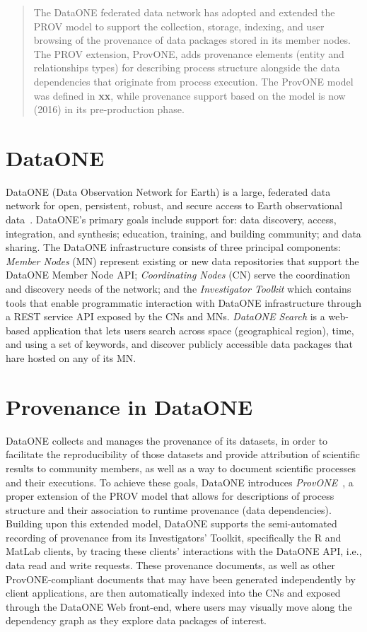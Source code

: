 \documentclass[a4paper]{llncs}
\begin{document}
\begin{abstract}
The DataONE federated data network has adopted and extended the PROV model to support the collection, storage, indexing, and user browsing of the provenance of data packages stored in its member nodes. The PROV extension, ProvONE, adds provenance elements (entity and relationships types) for describing process structure alongside the data dependencies that originate from process execution. The ProvONE model was defined in \textbf{xx}, while provenance support based on the model is now (2016) in its pre-production phase.
\end{abstract}

\section{DataONE}

DataONE (Data Observation Network for Earth) is a large, federated data network for open, persistent, robust, and secure access to Earth observational data~\cite{dataone}. DataONE's primary goals include support for: data discovery, access, integration, and synthesis; education, training, and building community; and data sharing. The DataONE infrastructure consists of three principal components:
\emph{Member Nodes} (MN) represent existing or new data repositories that support the DataONE Member Node API; \emph{Coordinating Nodes} (CN) serve the coordination and discovery needs of the network; and the \emph{Investigator Toolkit} which contains tools that enable programmatic interaction with DataONE infrastructure through a REST service API exposed by the CNs and MNs.
\textit{DataONE Search} is a web-based application that lets users search across space (geographical region), time, and using a set of keywords, and discover publicly accessible data packages that hare hosted on any of its MN.

\section{Provenance in DataONE}

DataONE collects and manages the provenance of its datasets, in order to facilitate the reproducibility of those datasets and 
provide attribution of scientific results to community members, as well as a way to document scientific processes and their executions. 
%
To achieve these goals, DataONE introduces \textit{ProvONE}~\cite{provone}, a proper extension of the PROV model that allows for descriptions of process structure and their association to runtime provenance (data dependencies).
Building upon this extended model, DataONE supports the semi-automated recording of provenance from its Investigators' Toolkit, specifically the R and MatLab clients, by tracing these clients' interactions with the DataONE API,  i.e., data read and write requests.
These provenance documents, as well as other ProvONE-compliant documents that may have been generated independently by client applications, are then automatically indexed into the CNs and exposed through the DataONE Web front-end, where users may visually move along the dependency graph as they explore data packages of interest.
\end{document}
